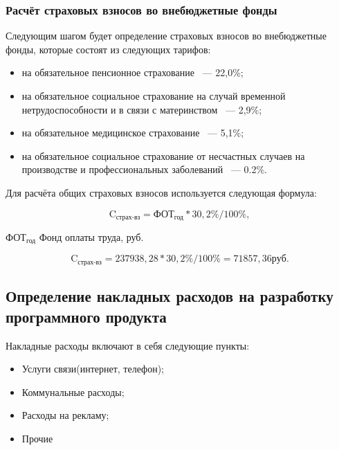 \subsubsection{Расчёт страховых взносов во внебюджетные фонды}

Следующим шагом будет определение страховых взносов во внебюджетные фонды, которые состоят
из следующих тарифов:

\begin{itemize}
    \item на обязательное пенсионное страхование ~--- 22,0\%;
    \item на обязательное социальное страхование на случай временной нетрудоспособности и в связи с материнством ~--- 2,9\%;
    \item на обязательное медицинское страхование ~--- 5,1\%;
    \item на обязательное социальное страхование от несчастных случаев на производстве и профессиональных заболеваний ~--- 0.2\%.
\end{itemize}

Для расчёта общих страховых взносов используется следующая формула:

\begin{equation}
    \text{C}_\text{страх-вз} = \text{ФОТ}_\text{год} * 30,2\% / 100\%,
\end{equation}

\begin{eqexpl}[25mm]
    \item{$\text{ФОТ}_\text{год}$} Фонд оплаты труда, руб.
\end{eqexpl}

\begin{equation*}
    \text{C}_\text{страх-вз} = 237938,28 * 30,2\% / 100\% = 71857,36 руб.
\end{equation*}

\tocless\subsection{Определение накладных расходов на разработку программного продукта}

Накладные расходы включают в себя следующие пункты:

\begin{itemize}
    \item Услуги связи(интернет, телефон);
    \item Коммунальные расходы;
    \item Расходы на рекламу;
    \item Прочие
\end{itemize}

